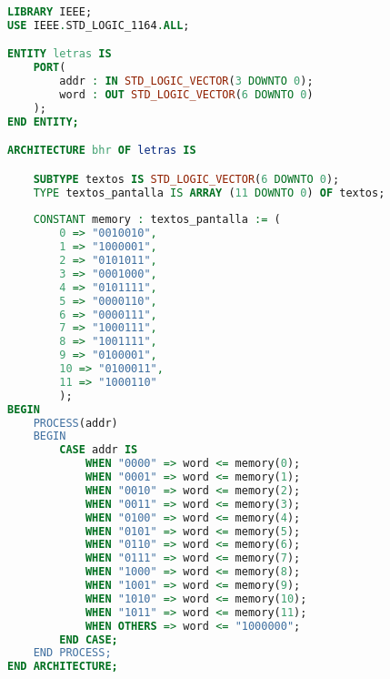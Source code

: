 \begin{lstlisting}[language={vhdl}, caption={Letras}, label={Script}]
LIBRARY IEEE;
USE IEEE.STD_LOGIC_1164.ALL;

ENTITY letras IS
	PORT(
		addr : IN STD_LOGIC_VECTOR(3 DOWNTO 0);
		word : OUT STD_LOGIC_VECTOR(6 DOWNTO 0)
	);
END ENTITY;

ARCHITECTURE bhr OF letras IS

	SUBTYPE textos IS STD_LOGIC_VECTOR(6 DOWNTO 0);
	TYPE textos_pantalla IS ARRAY (11 DOWNTO 0) OF textos;
	
	CONSTANT memory : textos_pantalla := (
		0 => "0010010",
		1 => "1000001",
		2 => "0101011",
		3 => "0001000",
		4 => "0101111",
		5 => "0000110",
		6 => "0000111",
		7 => "1000111",
		8 => "1001111",
		9 => "0100001",
		10 => "0100011",
		11 => "1000110"
		);
BEGIN
	PROCESS(addr)
	BEGIN
		CASE addr IS
			WHEN "0000" => word <= memory(0);
			WHEN "0001" => word <= memory(1);
			WHEN "0010" => word <= memory(2);
			WHEN "0011" => word <= memory(3);
			WHEN "0100" => word <= memory(4);
			WHEN "0101" => word <= memory(5);
			WHEN "0110" => word <= memory(6);
			WHEN "0111" => word <= memory(7);
			WHEN "1000" => word <= memory(8);
			WHEN "1001" => word <= memory(9);
			WHEN "1010" => word <= memory(10);
			WHEN "1011" => word <= memory(11);
			WHEN OTHERS => word <= "1000000";
		END CASE;
	END PROCESS;
END ARCHITECTURE;
	\end{lstlisting}
